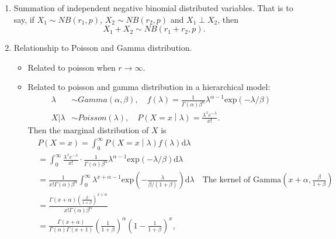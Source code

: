 \documentclass[a4paper,12pt]{article}
\begin{document}
\begin{enumerate}
\item Summation of independent negative binomial distributed variables. That is to say, if $X_1 \sim NB\left(r_1, p\right)$, $X_2 \sim NB\left(r_2, p\right)$ and $X_1 \perp X_2$, then
  \[
    X_1 + X_2 \sim NB\left(r_1 + r_2, p\right)
    .
  \]
\item Relationship to Poisson and Gamma distribution.
  \begin{itemize}
  \item Related to poisson when $r\to\infty$.
  \item Related to poisson and gamma distribution in a hierarchical model:
    \[
      \begin{aligned}
        \lambda &\sim Gamma\left(\alpha, \beta\right) ,\quad
        f\left(\lambda\right)
        = \frac{1}{\Gamma(\alpha)\beta^\alpha}
        \lambda^{\alpha - 1}
        \mathrm{exp}\left(-\lambda / \beta\right)    \\
        X|\lambda &\sim Poisson\left(\lambda\right) ,\quad
        P\left(X = x\middle|\lambda\right) = \frac{\lambda^xe^{-\lambda}}{x!}.
      \end{aligned}
    \]
    Then the marginal distribution of $X$ is
    \[
      \begin{aligned}
        & P\left(X = x\right)
        = \int_0^\infty P\left(X = x\middle|\lambda\right)f\left(\lambda\right)\mathrm{d}\lambda    \\
        &= \int_0^\infty
        \frac{\lambda^xe^{-\lambda}}{x!}
        \cdot
        \frac{1}{\Gamma(\alpha)\beta^\alpha}
        \lambda^{\alpha - 1}
        \mathrm{exp}\left(-\lambda / \beta\right)
        \mathrm{d}\lambda    \\
        &= \frac{1}{x!\Gamma\left(\alpha\right)\beta^\alpha}
        \int_0^\infty\lambda^{x + \alpha - 1}
        \mathrm{exp}\left(-\frac{\lambda}{\beta / \left(1 + \beta\right)}\right)
        \mathrm{d}\lambda
        \quad\text{The kernel of Gamma$(x + \alpha, \frac{\beta}{1 + \beta})$}    \\
        &= \frac{
          \Gamma\left(x + \alpha\right)
          \left(\frac{\beta}{1 + \beta}\right)^{x + \alpha}
        }{
          x!\Gamma\left(\alpha\right)\beta^\alpha
        }    \\
        &= \frac{\Gamma\left(x + \alpha\right)}{\Gamma\left(\alpha\right)\Gamma\left(x + 1\right)}
        \left(\frac{1}{1 + \beta}\right)^{\alpha}
        \left(1 - \frac{1}{1 + \beta}\right)^x, 
      \end{aligned}
\]
\end{itemize}
\end{enumerate}
\end{document}
